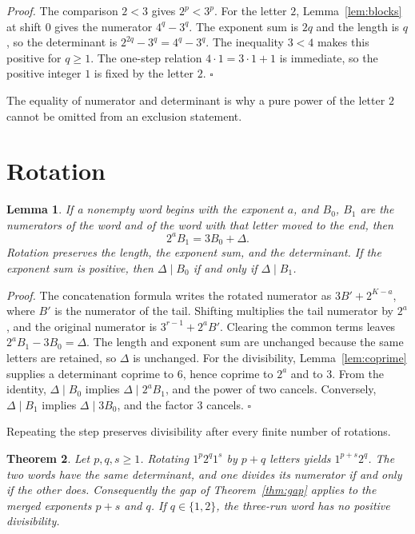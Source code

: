 \documentclass[11pt,letterpaper]{article}
\newtheorem{theorem}{Theorem}
\newtheorem{lemma}[theorem]{Lemma}
\newenvironment{proof}{\noindent\textit{Proof.}}{\hfill\(\square\)}
\begin{document}
\begin{proof}
The comparison \(2<3\) gives \(2^p<3^p\). For the letter \(2\), Lemma~\ref{lem:blocks} at shift \(0\) gives the numerator \(4^q-3^q\). The exponent sum is \(2q\) and the length is \(q\), so the determinant is \(2^{2q}-3^q=4^q-3^q\). The inequality \(3<4\) makes this positive for \(q\ge 1\). The one-step relation \(4\cdot 1=3\cdot 1+1\) is immediate, so the positive integer \(1\) is fixed by the letter \(2\).
\end{proof}

The equality of numerator and determinant is why a pure power of the letter \(2\) cannot be omitted from an exclusion statement.

\section{Rotation}

\begin{lemma}
\label{lem:rotate}
If a nonempty word begins with the exponent \(a\), and \(B_0\), \(B_1\) are the numerators of the word and of the word with that letter moved to the end, then
\[
2^a B_1=3B_0+\Delta.
\]
Rotation preserves the length, the exponent sum, and the determinant. If the exponent sum is positive, then \(\Delta\mid B_0\) if and only if \(\Delta\mid B_1\).
\end{lemma}

\begin{proof}
The concatenation formula writes the rotated numerator as \(3B'+2^{K-a}\), where \(B'\) is the numerator of the tail. Shifting multiplies the tail numerator by \(2^a\), and the original numerator is \(3^{r-1}+2^a B'\). Clearing the common terms leaves \(2^a B_1-3B_0=\Delta\). The length and exponent sum are unchanged because the same letters are retained, so \(\Delta\) is unchanged. For the divisibility, Lemma~\ref{lem:coprime} supplies a determinant coprime to \(6\), hence coprime to \(2^a\) and to \(3\). From the identity, \(\Delta\mid B_0\) implies \(\Delta\mid 2^a B_1\), and the power of two cancels. Conversely, \(\Delta\mid B_1\) implies \(\Delta\mid 3B_0\), and the factor \(3\) cancels.
\end{proof}

Repeating the step preserves divisibility after every finite number of rotations.

\begin{theorem}
\label{thm:three}
Let \(p,q,s\ge 1\). Rotating \(1^p2^q1^s\) by \(p+q\) letters yields \(1^{p+s}2^q\). The two words have the same determinant, and one divides its numerator if and only if the other does. Consequently the gap of Theorem~\ref{thm:gap} applies to the merged exponents \(p+s\) and \(q\). If \(q\in\{1,2\}\), the three-run word has no positive divisibility.
\end{theorem}
\end{document}
